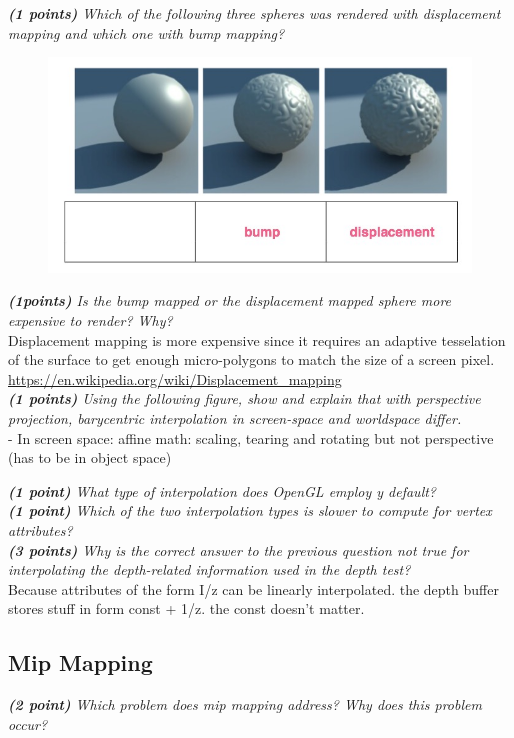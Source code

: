 \documentclass[a4paper,10pt]{article}
\begin{document}
\textit{\textbf{(1 points)} Which of the following three spheres was rendered with displacement
mapping and which one with bump mapping?}
\begin{figure}[H]
	\centering
	\includegraphics[width=.5\textwidth]{3-2-bump}
\end{figure}
\textit{\textbf{(1points) }Is the bump mapped or the displacement mapped sphere more expensive to render? Why?}\\

Displacement mapping is more expensive since it requires an adaptive tesselation
of the surface to get enough micro-polygons to match the size of a screen pixel.
\url{https://en.wikipedia.org/wiki/Displacement_mapping}\\

\textit{\textbf{(1 points)} Using the following figure, show and explain that with perspective projection, barycentric interpolation in screen-space and worldspace differ.
}\\

- In screen space: affine math: scaling, tearing and rotating but not perspective (has to be in object space)

\textit{\textbf{(1 point)} What type of interpolation  does OpenGL employ y default?}\\


\textit{\textbf{(1 point)} Which of the two interpolation types is slower to compute for vertex attributes?}\\


\textit{\textbf{(3 points)} Why is the correct answer to the previous question not true for interpolating the depth-related information used in the depth test?}\\

Because attributes of the form I/z can be linearly interpolated. the depth buffer stores stuff in form const + 1/z. the const doesn’t matter.

\subsection{Mip Mapping}
\textit{\textbf{(2 point)} Which problem does mip mapping address? Why does this problem occur?}\\
\end{document}
